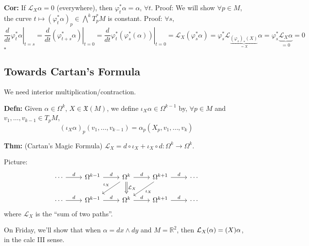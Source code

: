 \documentclass[10pt,letterpaper]{article}
\newcommand{\n}{\hfill\break}
\newcommand{\nn}{\vspace{0.5\baselineskip}\n}
\newcommand{\hangblock}[2]{\par\noindent\settowidth{\hangindent}{\textbf{#1: }}\textbf{#1: }\nolinebreak#2}
\newcommand{\defn}[1]{\hangblock{Defn}{#1}}
\newcommand{\thm}[1]{\hangblock{Thm}{#1}}
\newcommand{\cor}[1]{\hangblock{Cor}{#1}}
\newcommand{\proven}{\;$\square$\n}
\newcommand{\reals}{\mathbb{R}}
\newcommand{\R}{\reals}
\newcommand{\of}{\circ}
\newcommand{\restr}[2]{\left.#1\right|_{#2}}
\let\div\relax
\DeclareMathOperator{\div}{div}
\begin{document}
\cor{
	If $\mathcal{L}_{X}\alpha=0$ (everywhere), then $\varphi_{t}^{*}\alpha=\alpha$, $\forall{}t$.\nn
	Proof: We will show $\forall{}p\in{}M$, the curve $t\mapsto{}(\varphi_{t}^{*}\alpha)_{p}\in\bigwedge^{k}T_{p}^{*}M$ is constant.\nn
	Proof: $\forall{}s$,
	\[
		\restr{\frac{d}{dt}\varphi_{t}^{*}\alpha}{t=s}=\restr{\frac{d}{dt}(\varphi_{t+s}^{*}\alpha)}{t=0}=\restr{\frac{d}{dt}\varphi_{t}^{*}(\varphi_{s}^{*}(\alpha))}{t=0}=\mathcal{L}_{X}(\varphi_{s}^{*}\alpha)=\varphi_{s}^{*}\mathcal{L}_{\underbrace{(\varphi_{s})_{*}(X)}_{=X}}\alpha=\varphi_{s}^{*}\underbrace{\mathcal{L}_{X}\alpha}_{=0}=0
	\]
	\proven
}

\subsection*{Towards Cartan's Formula}

\par\noindent
We need interior multiplication/contraction.\n

\defn{
	Given $\alpha\in\Omega^{k}$, $X\in\mathfrak{X}(M)$, we define $\iota_{X}\alpha\in\Omega^{k-1}$ by, $\forall{}p\in{}M$ and $v_{1},\ldots,v_{k-1}\in{}T_{p}M$,
	\[
		(\iota_{X}\alpha)_{p}(v_{1},\ldots,v_{k-1})=\alpha_{p}(X_{p},v_{1},\ldots,v_{k})
	\]
}

\thm{
	(Cartan's Magic Formula) $\mathcal{L}_{X}=d\of\iota_{X}+\iota_{X}\of{}d:\Omega^{k}\to\Omega^{k}$.\n
}

\par\noindent
Picture:
\[
	\begin{tikzcd}
		\cdots \arrow[r,"d"] & \Omega^{k-1} \arrow[r,"d"] & \Omega^{k} \arrow[r,"d"] \arrow[dl,"\iota_{X}",swap] \arrow[d,"\mathcal{L}_{X}", Rightarrow] & \Omega^{k+1} \arrow[r,"d"] \arrow[dl,"\iota_{X}"] & \cdots\\
		\cdots \arrow[r,"d"] & \Omega^{k-1} \arrow[r,"d"] & \Omega^{k} \arrow[r,"d"] & \Omega^{k+1} \arrow[r,"d"] & \cdots
	\end{tikzcd}
\]
where $\mathcal{L}_{X}$ is the ``sum of two paths''.\n

\par\noindent
On Friday, we'll show that when $\alpha=dx\wedge{}dy$ and $M=\R^{2}$, then $\mathcal{L}_{X}(\alpha)=(\div{}X)\alpha$, in the calc III sense.
\end{document}
